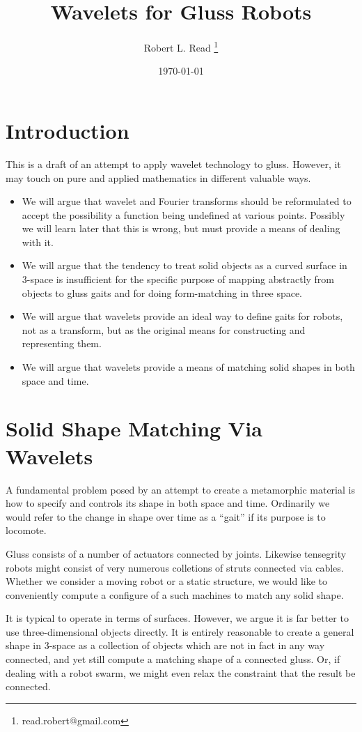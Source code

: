 \documentclass[11pt]{article}
\title{Wavelets for Gluss Robots}
\author{Robert L. Read
  \thanks{read.robert@gmail.com}
}
\affil{Founder, Public Invention, an educational non-profit.}
\date{\today}
\begin{document}
\maketitle


\section{Introduction}

This is a draft of an attempt to apply wavelet technology to gluss.
However, it may touch on pure and applied mathematics in different valuable ways.
\begin{itemize}  
\item We will argue that wavelet and Fourier transforms should be reformulated to
  accept the possibility a function being undefined at various points. Possibly we will
  learn later that this is wrong, but must provide a means of dealing with it.
\item We will argue that the tendency to treat solid objects as a curved surface in 3-space
  is insufficient for the specific purpose of mapping abstractly from objects to gluss gaits
  and for doing form-matching in three space.
\item We will argue that wavelets provide an ideal way to define gaits for robots,
  not as a transform, but as the original means for constructing and representing them.
\item We will argue that wavelets provide a means of matching solid shapes in both space and time.
\end{itemize}  

\section{Solid Shape Matching Via Wavelets}

A fundamental problem posed by an attempt to create a metamorphic material is how to specify and controls
its shape in both space and time. Ordinarily we would refer to the change in shape over time as a ``gait''
if its purpose is to locomote.

Gluss consists of a number of actuators connected by joints.  Likewise tensegrity robots might consist
of very numerous colletions of struts connected via cables. Whether we consider a moving robot or
a static structure, we would like to conveniently compute a configure of a such machines to match
any solid shape.

It is typical to operate in terms of surfaces. However, we argue it is far better to use three-dimensional
objects directly. It is entirely reasonable to create a general shape in 3-space as a collection of
objects which are not in fact in any way connected, and yet still compute a matching shape of a
connected gluss.  Or, if dealing with a robot swarm, we might even relax the constraint that the result
be connected.
\end{document}
